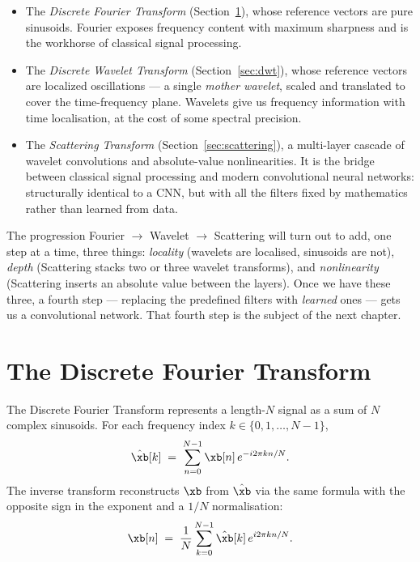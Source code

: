 \begin{itemize}
    \item The \emph{Discrete Fourier Transform} (Section~\ref{sec:dft}),
    whose reference vectors are pure sinusoids.  Fourier exposes
    frequency content with maximum sharpness and is the workhorse of
    classical signal processing.

    \item The \emph{Discrete Wavelet Transform} (Section~\ref{sec:dwt}),
    whose reference vectors are localized oscillations --- a single
    \emph{mother wavelet}, scaled and translated to cover the
    time-frequency plane.  Wavelets give us frequency information with
    time localisation, at the cost of some spectral precision.

    \item The \emph{Scattering Transform} (Section~\ref{sec:scattering}),
    a multi-layer cascade of wavelet convolutions and absolute-value
    nonlinearities.  It is the bridge between classical signal processing
    and modern convolutional neural networks: structurally identical to a
    CNN, but with all the filters fixed by mathematics rather than learned
    from data.
\end{itemize}

\noindent The progression Fourier $\to$ Wavelet $\to$ Scattering will
turn out to add, one step at a time, three things: \emph{locality}
(wavelets are localised, sinusoids are not), \emph{depth} (Scattering
stacks two or three wavelet transforms), and \emph{nonlinearity}
(Scattering inserts an absolute value between the layers).  Once we have
these three, a fourth step --- replacing the predefined filters with
\emph{learned} ones --- gets us a convolutional network.  That fourth
step is the subject of the next chapter.

\section{The Discrete Fourier Transform}
\label{sec:dft}

The Discrete Fourier Transform represents a length-$N$ signal as a sum
of $N$ complex sinusoids.  For each frequency index $k \in
\{0, 1, \ldots, N-1\}$,
\begin{equation}
    \hat{\xb}[k]
    \;=\;
    \sum_{n=0}^{N-1} \xb[n] \, e^{-i 2\pi k n / N}.
    \label{eq:dft}
\end{equation}
The inverse transform reconstructs $\xb$ from $\hat\xb$ via the same
formula with the opposite sign in the exponent and a $1/N$ normalisation:
\begin{equation}
    \xb[n]
    \;=\;
    \frac{1}{N} \sum_{k=0}^{N-1} \hat{\xb}[k] \, e^{i 2 \pi k n / N}.
    \label{eq:idft}
\end{equation}

